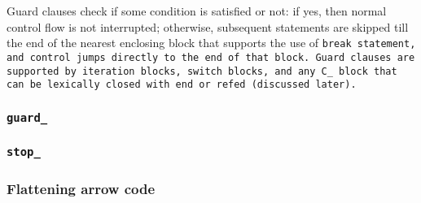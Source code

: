 \def\Subsubsection#1{\subsubsection{#1}
}

Guard clauses check if some condition is satisfied or not:
if yes, then normal control flow is not interrupted; otherwise,
subsequent statements are skipped till the end of the nearest
enclosing block that supports the use of \tt{break} statement,
and control jumps directly to the end of that block.
Guard clauses are supported by iteration blocks, switch blocks, and any C\_
block that can be lexically closed with \tt{end} or \tt{refed} (discussed later).

\subsubsection{\tt{guard_}}


\subsubsection{\tt{stop_}}


\Subsubsection{Flattening arrow code}
